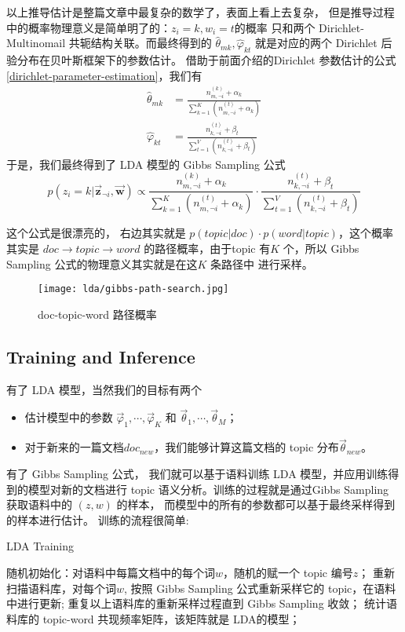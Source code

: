 以上推导估计是整篇文章中最复杂的数学了，表面上看上去复杂，
但是推导过程中的概率物理意义是简单明了的：$z_i = k, w_i = t $的概率
只和两个 Dirichlet-Multinomail 共轭结构关联。而最终得到的 $\hat{\theta}_{mk}, \hat{\varphi}_{kt}$
就是对应的两个 Dirichlet 后验分布在贝叶斯框架下的参数估计。
借助于前面介绍的Dirichlet 参数估计的公式 \eqref{dirichlet-parameter-estimation}，我们有
\begin{align*}
\hat{\theta}_{mk} &= \frac{n_{m,\neg i}^{(k)} + \alpha_k}{\sum_{k=1}^K (n_{m,\neg i}^{(t)} + \alpha_k)} \\
\hat{\varphi}_{kt} &= \frac{n_{k,\neg i}^{(t)} + \beta_t}{\sum_{t=1}^V (n_{k,\neg i}^{(t)} + \beta_t)}
\end{align*}
于是，我们最终得到了 LDA 模型的 Gibbs Sampling 公式
\begin{equation}
\label{gibbs-sampling}
p(z_i = k|\vec{\mathbf{z}}_{\neg i}, \vec{\mathbf{w}})  \propto
\frac{n_{m,\neg i}^{(k)} + \alpha_k}{\sum_{k=1}^K (n_{m,\neg i}^{(t)} + \alpha_k)}
\cdot \frac{n_{k,\neg i}^{(t)} + \beta_t}{\sum_{t=1}^V (n_{k,\neg i}^{(t)} + \beta_t)}
\end{equation}

这个公式是很漂亮的， 右边其实就是 $p(topic|doc) \cdot p(word|topic)$，这个概率其实是 $doc \rightarrow topic \rightarrow word$ 的路径概率，由于topic 有$K$ 个，所以 Gibbs Sampling 公式的物理意义其实就是在这$K$ 条路径中
进行采样。

\begin{figure}[H]
\centering
\texttt{[image: lda/gibbs-path-search.jpg]}
\caption{doc-topic-word 路径概率}
\end{figure}

\subsection{Training and Inference}

有了 LDA 模型，当然我们的目标有两个
\begin{itemize}
\item 估计模型中的参数 $\vec{\varphi}_1, \cdots, \vec{\varphi}_K$ 和 $\vec{\theta}_1, \cdots, \vec{\theta}_M$；
\item 对于新来的一篇文档$doc_{new}$，我们能够计算这篇文档的 topic 分布$\vec{\theta}_{new}$。
\end{itemize}

有了 Gibbs Sampling 公式， 我们就可以基于语料训练 LDA 模型，并应用训练得到的模型对新的文档进行
topic 语义分析。训练的过程就是通过Gibbs Sampling 获取语料中的 $(z,w)$ 的样本，
而模型中的所有的参数都可以基于最终采样得到的样本进行估计。
训练的流程很简单:
\begin{algorithm}[H]
\caption{LDA Training}
\begin{algorithmic}[1]
\STATE 随机初始化：对语料中每篇文档中的每个词$w$，随机的赋一个 topic 编号$z$；
\STATE 重新扫描语料库，对每个词$w$, 按照 Gibbs Sampling 公式重新采样它的 topic，在语料中进行更新;
\STATE 重复以上语料库的重新采样过程直到 Gibbs Sampling 收敛；
\STATE 统计语料库的 topic-word 共现频率矩阵，该矩阵就是 LDA的模型；
\end{algorithmic}
\end{algorithm}

